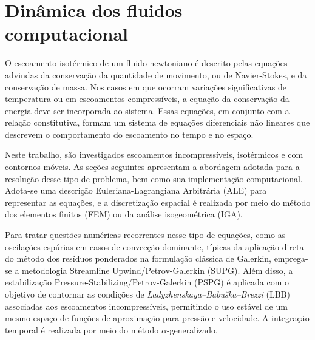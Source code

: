 \documentclass[tese_patricia]{subfiles}%
\begin{document}
\chapter[Dinâmica dos fluidos computacional]{Dinâmica dos fluidos computacional}
\label{capitulo:Cap2}

O escoamento isotérmico de um fluido newtoniano é descrito pelas equações advindas da conservação da quantidade de movimento, ou de Navier-Stokes, e da conservação de massa. Nos casos em que ocorram variações significativas de temperatura ou em escoamentos compressíveis, a equação da conservação da energia deve ser incorporada ao sistema. Essas equações, em conjunto com a relação constitutiva, formam um sistema de equações diferenciais não lineares que descrevem o comportamento do escoamento no tempo e no espaço. 

Neste trabalho, são investigados escoamentos incompressíveis, isotérmicos e com contornos móveis. As seções seguintes apresentam a abordagem adotada para a resolução desse tipo de problema, bem como sua implementação computacional. Adota-se uma descrição Euleriana-Lagrangiana Arbitrária (ALE) para representar as equações, e a discretização espacial é realizada por meio do método dos elementos finitos (FEM) ou da análise isogeométrica (IGA).

Para tratar questões numéricas recorrentes nesse tipo de equações, como as oscilações espúrias em casos de convecção dominante, típicas da aplicação direta do método dos resíduos ponderados na formulação clássica de Galerkin, emprega-se a metodologia Streamline Upwind/Petrov-Galerkin (SUPG). Além disso, a estabilização Pressure-Stabilizing/Petrov-Galerkin (PSPG) é aplicada com o objetivo de contornar as condições de \textit{Ladyzhenskaya–Babuška–Brezzi} (LBB) associadas aos escoamentos incompressíveis, permitindo o uso estável de um mesmo espaço de funções de aproximação para pressão e velocidade. A integração temporal é realizada por meio do método $\alpha$-generalizado.
\end{document}
